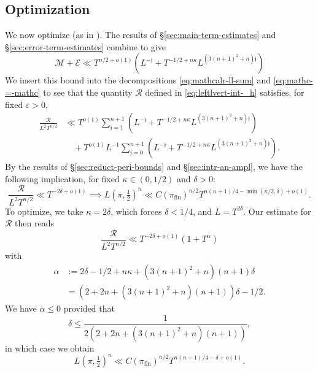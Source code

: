 \documentclass[reqno]{amsart}
\def\eps{\varepsilon}
\DeclareMathOperator{\fin}{fin}
\theoremstyle{plain} \newtheorem{theorem} {Theorem}
\theoremstyle{definition} \newtheorem{definition} [theorem] {Definition}
\theoremstyle{itplain} %
\numberwithin{equation}{section}
\numberwithin{theorem}{section}
\renewcommand{\leq}{\leqslant}
\begin{document}
\subsection{Optimization}\label{sec:optimization}
We now optimize (as in \cite[\S6.6]{2020arXiv201202187N}).  The results of \S\ref{sec:main-term-estimates} and \S\ref{sec:error-term-estimates} combine to give
\begin{equation*}
  \mathcal{M} + \mathcal{E} \ll
  T^{n/2 + o(1)} (
  L^{-\mathfrak{j}}+ T^{-1/2 + n \kappa} L^{(3(n+1)^2 + n) \mathfrak{j}})  
\end{equation*}
We insert this bound into the decompositions \eqref{eq:mathcalr-ll-sum} and \eqref{eq:mathc-=-mathc} to see that the quantity $\mathcal{R}$ defined in \eqref{eq:leftlvert-int-_h} satisfies, for fixed $\eps > 0$,
\begin{align*}
  \frac{\mathcal{R}}{L^2 T^{n/2}}
  &\ll T^{o(1)}  \sum_{\mathfrak{j}=1}^{n+1} \left( L^{-\mathfrak{j}} + T^{-1/2 + n \kappa} L^{(3(n+1)^2  + n) \mathfrak{j}}
    \right) \\
  &\quad + T^{o(1)} L^{-1} \sum _{\mathfrak{j} = 0}^{n+1} \left(
    L^{- \mathfrak{j}} + T^{-1/2 + n \kappa}  L^{(3(n+1)^2  + n) \mathfrak{j}}
    \right).
\end{align*}
By the results of \S\ref{sec:reduct-peri-bounds} and \S\ref{sec:intr-an-ampl}, we have the following implication, for fixed $\kappa \in (0, 1/2)$ and $\delta > 0$:
\begin{equation*}
  \frac{\mathcal{R}}{L^2 T^{n/2}} \ll T^{- 2 \delta + o(1)}
  \implies
  L(\pi,\tfrac{1}{2})^n \ll C(\pi_{\fin})^{n/2} T^{n(n+1)/4 - \min(\kappa/2,\delta) + o(1)}.
\end{equation*}
To optimize, we take $\kappa = 2 \delta$, which forces $\delta < 1/4$, and $L = T^{2 \delta}$.  Our estimate for $\mathcal{R}$ then reads
\[
  \frac{\mathcal{R}}{L^2 T^{n/2}}
  \ll
  T^{- 2 \delta + o(1)} ( 1 + T^{\alpha} )
\]
with
\begin{align*}
  \alpha
  &:=
    2 \delta -1/2 + n \kappa
  +
  (3 (n+1)^2 + n)(n+1) \delta  \\
  &=
    (2 + 2 n + (3 (n+1)^2  + n)(n+1)) \delta - 1/2.
\end{align*}
We have $\alpha \leq 0$ provided that
\begin{equation*}
  \delta \leq \frac{1}{2 (2 + 2 n + (3 (n+1)^2 + n)(n+1))},
\end{equation*}
in which case we obtain
\begin{equation*}
  L(\pi,\tfrac{1}{2})^n \ll C(\pi_{\fin})^{n/2} T^{n(n+1)/4 - \delta + o(1)}.
\end{equation*}
\end{document}
